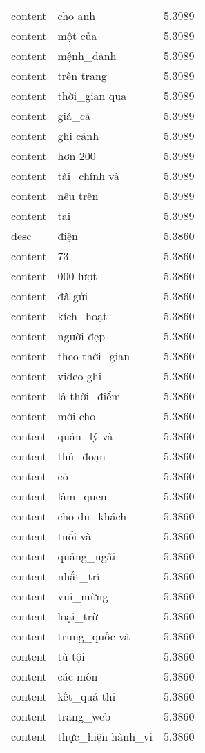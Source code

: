 \documentclass{article}
\begin{document}
\begin{tabular}{lll}
content & cho anh & 5.3989\\
content & một của & 5.3989\\
content & mệnh\_danh & 5.3989\\
content & trên trang & 5.3989\\
content & thời\_gian qua & 5.3989\\
content & giá\_cả & 5.3989\\
content & ghi cảnh & 5.3989\\
content & hơn 200 & 5.3989\\
content & tài\_chính và & 5.3989\\
content & nêu trên & 5.3989\\
content & tai & 5.3989\\
desc & điện & 5.3860\\
content & 73 & 5.3860\\
content & 000 lượt & 5.3860\\
content & đã gửi & 5.3860\\
content & kích\_hoạt & 5.3860\\
content & người đẹp & 5.3860\\
content & theo thời\_gian & 5.3860\\
content & video ghi & 5.3860\\
content & là thời\_điểm & 5.3860\\
content & mới cho & 5.3860\\
content & quản\_lý và & 5.3860\\
content & thủ\_đoạn & 5.3860\\
content & cỏ & 5.3860\\
content & làm\_quen & 5.3860\\
content & cho du\_khách & 5.3860\\
content & tuổi và & 5.3860\\
content & quảng\_ngãi & 5.3860\\
content & nhất\_trí & 5.3860\\
content & vui\_mừng & 5.3860\\
content & loại\_trừ & 5.3860\\
content & trung\_quốc và & 5.3860\\
content & tù tội & 5.3860\\
content & các môn & 5.3860\\
content & kết\_quả thi & 5.3860\\
content & trang\_web & 5.3860\\
content & thực\_hiện hành\_vi & 5.3860\\

\end{tabular}
\end{document}
